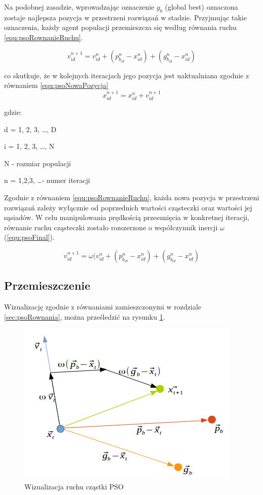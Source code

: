 Na podobnej zasadzie, wprowadzając oznaczenie $g_b$ (global best) oznaczona zostaje najlepsza pozycja w przestrzeni rozwiązań w stadzie. Przyjmując takie oznaczenia, każdy agent populacji przemieszcza się według równania ruchu \ref{equ:psoRownanieRuchu}.

\begin{equation}
\label{equ:psoRownanieRuchu}
v_{id}^{n+1} = v_{id}^{n} + (p_{b_{id}}^n - x_{id}^n) + (g_{b_{id}}^n - x_{id}^n)
\end{equation}

co skutkuje, że w kolejnych iteracjach jego pozycja jest uaktualniana zgodnie z równaniem \ref{equ:psoNowaPozycja}
\begin{equation}
\label{equ:psoNowaPozycja}
x_{id}^{n+1} = x_{id}^n + v_{id}^{n+1}
\end{equation}

gdzie:

d = 1, 2, 3, \dots, D

i = 1, 2, 3, \dots, N

N - rozmiar populacji

n = 1,2,3, \dots - numer iteracji

Zgodnie z równaniem \ref{equ:psoRownanieRuchu}, każda nowa pozycja w przestrzeni rozwiązań zależy wyłącznie od poprzednich wartości cząsteczki oraz wartości jej sąsiadów. W celu manipulowania prędkością przesunięcia w konkretnej iteracji, równanie ruchu cząsteczki zostało rozszerzone o współczynnik inercji $\omega$ (\ref{equ:psoFinal}).

\begin{equation}
\label{equ:psoFinal}
v_{id}^{n+1} = \omega(v_{id}^{n} + (p_{b_{id}}^n - x_{id}^n) + (g_{b_{id}}^n - x_{id}^n)
\end{equation}


\subsection{Przemieszczenie}
\label{sec:psoPrzemieszczenie}
Wizualizację zgodnie z równaniami zamieszczonymi w rozdziale \ref{sec:psoRownania}, można prześledzić na rysunku \ref{fig:psoWizualizacja}.

\begin{figure}[H]
\begin{center} 
\includegraphics[scale=0.8]{tresc/pics/psoRuch.png}
\caption{Wizualizacja ruchu cząstki PSO}
\label{fig:psoWizualizacja}
\end{center}
\end{figure}

